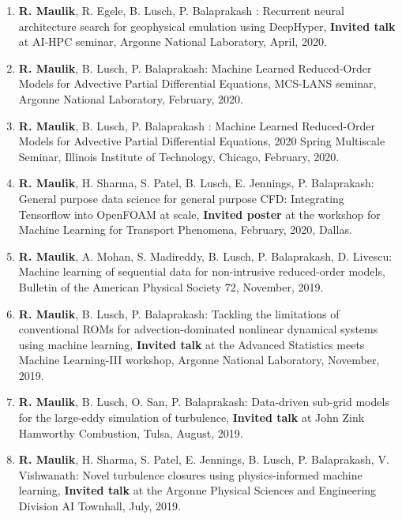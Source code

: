 \documentclass[letterpaper]{article}
\begin{document}
\begin{enumerate}
\item \textbf{R. Maulik}, R. Egele, B. Lusch, P. Balaprakash : Recurrent neural architecture search for geophysical emulation using DeepHyper, \textbf{Invited talk} at AI-HPC seminar, Argonne National Laboratory, April, 2020.

\item \textbf{R. Maulik}, B. Lusch, P. Balaprakash: Machine Learned Reduced-Order Models for Advective Partial Differential Equations, MCS-LANS seminar, Argonne National Laboratory, February, 2020.

\item \textbf{R. Maulik}, B. Lusch, P. Balaprakash : Machine Learned Reduced-Order Models for Advective Partial Differential Equations, 2020 Spring Multiscale Seminar, Illinois Institute of Technology, Chicago, February, 2020.

\item \textbf{R. Maulik}, H. Sharma, S. Patel, B. Lusch, E. Jennings, P. Balaprakash: General purpose data science for general purpose CFD: Integrating Tensorflow into OpenFOAM at scale, \textbf{Invited poster} at the workshop for Machine Learning for Transport Phenomena, February, 2020, Dallas.

\item \textbf{R. Maulik}, A. Mohan, S. Madireddy, B. Lusch, P. Balaprakash, D. Livescu: Machine learning of sequential data for non-intrusive reduced-order models, Bulletin of the American Physical Society 72, November, 2019.

\item \textbf{R. Maulik}, B. Lusch, P. Balaprakash: Tackling the limitations of conventional ROMs for advection-dominated nonlinear dynamical systems using machine learning, \textbf{Invited talk} at the Advanced Statistics meets Machine Learning-III workshop, Argonne National Laboratory, November, 2019.

\item \textbf{R. Maulik}, B. Lusch, O. San, P. Balaprakash: Data-driven sub-grid models for the large-eddy simulation of turbulence, \textbf{Invited talk} at John Zink Hamworthy Combustion, Tulsa, August, 2019.

\item \textbf{R. Maulik}, H. Sharma, S. Patel, E. Jennings, B. Lusch, P. Balaprakash, V. Vishwanath: Novel turbulence closures using physics-informed machine learning, \textbf{Invited talk} at the Argonne Physical Sciences and Engineering Division AI Townhall, July, 2019. 


\end{enumerate}
\end{document}
